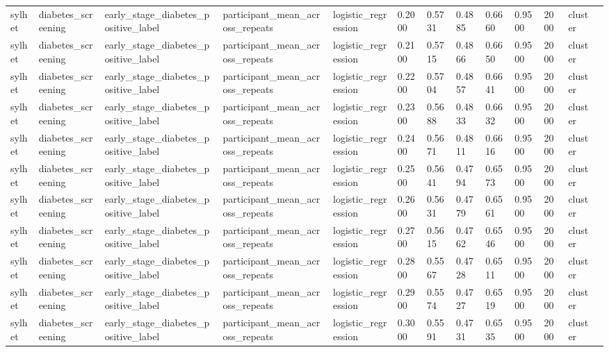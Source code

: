 \begin{tabular}{lllllllllllll}
sylhet & diabetes\_screening & early\_stage\_diabetes\_positive\_label & participant\_mean\_across\_repeats & logistic\_regression & 0.2000 & 0.5731 & 0.4885 & 0.6660 & 0.9500 & 2000 & cluster &  \\
sylhet & diabetes\_screening & early\_stage\_diabetes\_positive\_label & participant\_mean\_across\_repeats & logistic\_regression & 0.2100 & 0.5715 & 0.4866 & 0.6650 & 0.9500 & 2000 & cluster &  \\
sylhet & diabetes\_screening & early\_stage\_diabetes\_positive\_label & participant\_mean\_across\_repeats & logistic\_regression & 0.2200 & 0.5704 & 0.4857 & 0.6641 & 0.9500 & 2000 & cluster &  \\
sylhet & diabetes\_screening & early\_stage\_diabetes\_positive\_label & participant\_mean\_across\_repeats & logistic\_regression & 0.2300 & 0.5688 & 0.4833 & 0.6632 & 0.9500 & 2000 & cluster &  \\
sylhet & diabetes\_screening & early\_stage\_diabetes\_positive\_label & participant\_mean\_across\_repeats & logistic\_regression & 0.2400 & 0.5671 & 0.4811 & 0.6616 & 0.9500 & 2000 & cluster &  \\
sylhet & diabetes\_screening & early\_stage\_diabetes\_positive\_label & participant\_mean\_across\_repeats & logistic\_regression & 0.2500 & 0.5641 & 0.4794 & 0.6573 & 0.9500 & 2000 & cluster &  \\
sylhet & diabetes\_screening & early\_stage\_diabetes\_positive\_label & participant\_mean\_across\_repeats & logistic\_regression & 0.2600 & 0.5631 & 0.4779 & 0.6561 & 0.9500 & 2000 & cluster &  \\
sylhet & diabetes\_screening & early\_stage\_diabetes\_positive\_label & participant\_mean\_across\_repeats & logistic\_regression & 0.2700 & 0.5615 & 0.4762 & 0.6546 & 0.9500 & 2000 & cluster &  \\
sylhet & diabetes\_screening & early\_stage\_diabetes\_positive\_label & participant\_mean\_across\_repeats & logistic\_regression & 0.2800 & 0.5567 & 0.4728 & 0.6511 & 0.9500 & 2000 & cluster &  \\
sylhet & diabetes\_screening & early\_stage\_diabetes\_positive\_label & participant\_mean\_across\_repeats & logistic\_regression & 0.2900 & 0.5574 & 0.4727 & 0.6519 & 0.9500 & 2000 & cluster &  \\
sylhet & diabetes\_screening & early\_stage\_diabetes\_positive\_label & participant\_mean\_across\_repeats & logistic\_regression & 0.3000 & 0.5591 & 0.4731 & 0.6535 & 0.9500 & 2000 & cluster &  \\

\end{tabular}
